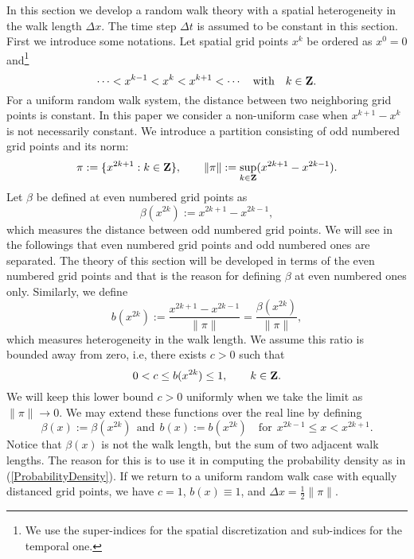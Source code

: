 \documentclass[11pt]{amsart}
\def\Z{\mathbb{Z}}
\def\Z{{\bf Z}}
\begin{document}
In this section we develop a random walk theory with a spatial heterogeneity in the walk length $\Delta x$. The time step $\Delta t$ is assumed to be constant in this section. First we introduce some notations. Let spatial grid points $x^k$ be ordered as $x^0=0$ and\footnote{We use the super-indices for the spatial discretization and sub-indices for the temporal one.}
\begin{equation}\label{x^k}
\cdots<x^{k-1}<x^k<x^{k+1}<\cdots \quad\text{with}\quad k\in\Z.
\end{equation}
For a uniform random walk system, the distance between two neighboring grid points is constant. In this paper we consider a non-uniform case when $x^{k+1}-x^{k}$ is not necessarily constant. We introduce a partition consisting of odd numbered grid points and its norm:
\begin{equation}\label{pi}
\pi:=\{x^{2k+1}:k\in\Z\},\qquad\|\pi\|:=\sup_{k\in\Z}(x^{2k+1}-x^{2k-1}).
\end{equation}
Let $\beta$ be defined at even numbered grid points as
\begin{equation}\label{betax2k}
\beta(x^{2k}):=x^{2k+1}-x^{2k-1},
\end{equation}
which measures the distance between odd numbered grid points. We will see in the followings that even numbered grid points and odd numbered ones are separated. The theory of this section will be developed in terms of the even numbered grid points and that is the reason for defining $\beta$ at even numbered ones only. Similarly, we define
\begin{equation}\label{bx2k}
b(x^{2k}):=\frac{x^{2k+1}-x^{2k-1}}{\|\pi\|}=\frac{\beta(x^{2k})}{\|\pi\|},
\end{equation}
which measures heterogeneity in the walk length. We assume this ratio is bounded away from zero, i.e, there exists $c>0$ such that
\begin{equation}\label{c}
0<c\le b(x^{2k})\le 1,\qquad k\in\Z.
\end{equation}
We will keep this lower bound $c>0$ uniformly when we take the limit as $\|\pi\|\to0$. We may extend these functions over the real line by defining
\begin{equation}\label{continuation}
\beta(x):=\beta(x^{2k})\ \
 \text{and}\ \ b(x):=b(x^{2k})\quad\text{for}\ \ x^{2k-1}\leq x<x^{2k+1}.
\end{equation}
Notice that $\beta(x)$ is not the walk length, but the sum of two adjacent walk lengths. The reason for this is to use it in computing the probability density as in (\ref{ProbabilityDensity}). If we return to a uniform random walk case with equally distanced grid points, we have $c=1$, $b(x)\equiv 1$, and $\Delta x =\frac{1}{2}\|\pi\|$.
\end{document}
